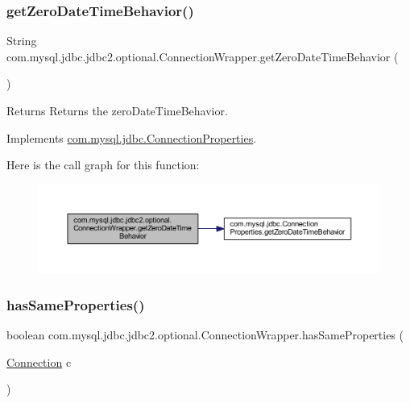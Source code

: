 \subsubsection{\texorpdfstring{get\+Zero\+Date\+Time\+Behavior()}{getZeroDateTimeBehavior()}}
{\footnotesize\ttfamily String com.\+mysql.\+jdbc.\+jdbc2.\+optional.\+Connection\+Wrapper.\+get\+Zero\+Date\+Time\+Behavior (\begin{DoxyParamCaption}{ }\end{DoxyParamCaption})}

\begin{DoxyReturn}{Returns}
Returns the zero\+Date\+Time\+Behavior. 
\end{DoxyReturn}


Implements \mbox{\hyperlink{interfacecom_1_1mysql_1_1jdbc_1_1_connection_properties_a1101064e308d3d8aabe9560851a5d6b6}{com.\+mysql.\+jdbc.\+Connection\+Properties}}.

Here is the call graph for this function\+:
\nopagebreak
\begin{figure}[H]
\begin{center}
\leavevmode
\includegraphics[width=350pt]{classcom_1_1mysql_1_1jdbc_1_1jdbc2_1_1optional_1_1_connection_wrapper_a018005289e60ac341a0911f9e1f9dbb8_cgraph}
\end{center}
\end{figure}
\mbox{\label{classcom_1_1mysql_1_1jdbc_1_1jdbc2_1_1optional_1_1_connection_wrapper_a374522991d8d1ed955de5defd526a59d}} 
\subsubsection{\texorpdfstring{has\+Same\+Properties()}{hasSameProperties()}}
{\footnotesize\ttfamily boolean com.\+mysql.\+jdbc.\+jdbc2.\+optional.\+Connection\+Wrapper.\+has\+Same\+Properties (\begin{DoxyParamCaption}\item[{\mbox{\hyperlink{interfacecom_1_1mysql_1_1jdbc_1_1_connection}{Connection}}}]{c }\end{DoxyParamCaption})}

